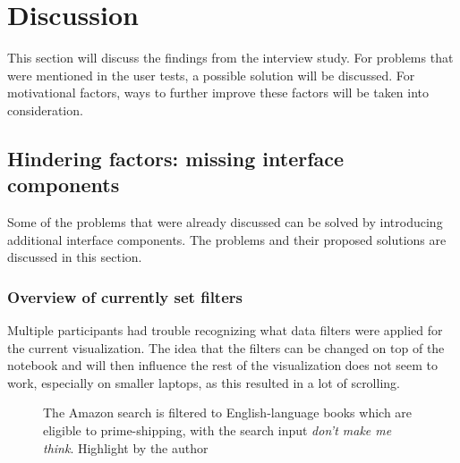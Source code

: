 \section{Discussion}
This section will discuss the findings from the interview study. For problems that were mentioned in the user tests, a possible solution will be discussed. For motivational factors, ways to further improve these factors will be taken into consideration.

\subsection{Hindering factors: missing interface components}
Some of the problems that were already discussed can be solved by introducing additional interface components. The problems and their proposed solutions are discussed in this section.

\subsubsection*{Overview of currently set filters}
Multiple participants had trouble recognizing what data filters were applied for the current visualization. The idea that the filters can be changed on top of the notebook and will then influence the rest of the visualization does not seem to work, especially on smaller laptops, as this resulted in a lot of scrolling.

\begin{figure}[htbp]
    \caption{The Amazon search is filtered to English-language books which are eligible to prime-shipping, with the search input \emph{don't make me think}. Highlight by the author}
    \label{fig:amazon_filters}
\end{figure}

